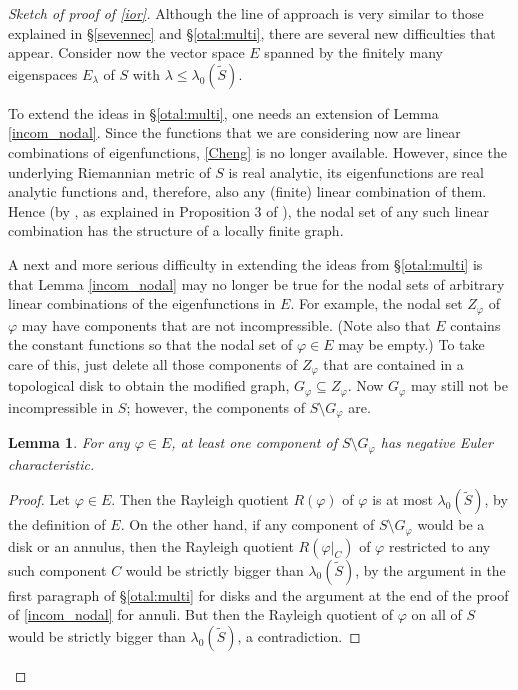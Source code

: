 \documentclass[a4paper,11pt]{amsart}
\numberwithin{equation}{section}
\newtheorem{lem}[equation]{Lemma}
\theoremstyle{definition}
\def\vf{\varphi}
\begin{document}
\begin{proof}[Sketch of proof of \cref{ior}]
Although the line of approach is very similar to those explained in  \S \ref{sevennec} and \S \ref{otal:multi}, there are several new difficulties that appear.
Consider now the vector space $E$ spanned by the finitely many eigenspaces $E_\lambda$ of $S$ with $\lambda\le\lambda_0(\tilde S)$.

To extend the ideas in \S \ref{otal:multi}, one needs an extension of Lemma \ref{incom_nodal}.
Since the functions that we are considering now are linear combinations of eigenfunctions, \cref{Cheng} is no longer available.
However, since the underlying Riemannian metric of $S$ is real analytic, its eigenfunctions are real analytic functions and, therefore, also any (finite) linear combination of them. 
Hence (by \cite{L}, as explained in Proposition 3 of \cite{OR}), the nodal set of any such linear combination has the structure of a locally finite graph.

A next and more serious difficulty in extending the ideas from \S \ref{otal:multi} is that Lemma \ref{incom_nodal}
may no longer be true for the nodal sets of arbitrary linear combinations of the eigenfunctions in $E$. 
For example, the nodal set $Z_\varphi$ of $\varphi$ may have components that are not incompressible.
(Note also that $E$ contains the constant functions so that the nodal set of $\vf\in E$ may be empty.)
To take care of this, just delete all those components of $Z_\varphi$ that are contained in a topological disk
to obtain the modified graph, $G_\vf\subseteq Z_\vf$.
Now $G_\varphi$ may still not be incompressible in $S$;
however, the components of $S\setminus G_\vf$ are.

\begin{lem}\label{nodom}
For any $\vf\in E$, at least one component of $S\setminus G_\vf$ has negative Euler characteristic.
\end{lem}

\begin{proof}
Let $\vf\in E$.
Then the Rayleigh quotient $R(\varphi)$ of $\varphi$ is at most $\lambda_0(\tilde S)$, by the definition of $E$.
On the other hand, if any component of $S\setminus G_\vf$ would be a disk or an annulus,
then the Rayleigh quotient $R(\varphi|_C)$ of $\varphi$ restricted to any such component $C$ would be strictly bigger than $\lambda_0(\tilde S)$, by the argument in the first paragraph of \S \ref{otal:multi} for disks and the argument at the end of the proof of \cref{incom_nodal} for annuli.
But then the Rayleigh quotient of $\varphi$ on all of $S$ would be strictly bigger than $\lambda_0(\tilde S)$,
a contradiction. 
\end{proof}


\end{proof}
\end{document}
